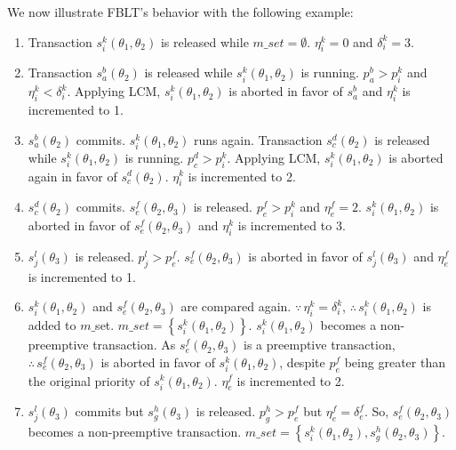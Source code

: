 \documentclass[prodmode,acmtecs]{acmsmall}
\begin{document}
We now illustrate FBLT's behavior with the following example:
\begin{enumerate}
\item Transaction $s_{i}^{k}(\theta_{1},\theta_{2})$ is released while
$m\_set=\emptyset$. $\eta_{i}^{k}=0$ and $\delta_{i}^{k}=3$.
\item \label{fblt_ex_step 2} Transaction $s_{a}^{b}(\theta_{2})$ is released
while $s_{i}^{k}(\theta_{1},\theta_{2})$ is running. $p_{a}^{b}>p_{i}^{k}$
and $\eta_{i}^{k}<\delta_{i}^{k}$. Applying LCM, $s_{i}^{k}(\theta_{1},\theta_{2})$
is aborted in favor of $s_{a}^{b}$ and $\eta_{i}^{k}$ is incremented
to 1.
\item $s_{a}^{b}(\theta_{2})$ commits. $s_{i}^{k}(\theta_{1},\theta_{2})$
runs again. Transaction $s_{c}^{d}(\theta_{2})$ is released while
$s_{i}^{k}(\theta_{1},\theta_{2})$ is running. $p_{c}^{d}>p_{i}^{k}$. Applying LCM, $s_{i}^{k}(\theta_{1},\theta_{2})$ is aborted again in favor of $s_{c}^{d}(\theta_{2})$.
$\eta_{i}^{k}$ is incremented to 2.
\item $s_{c}^{d}(\theta_{2})$ commits. $s_{e}^{f}(\theta_{2},\theta_{3})$
is released. $p_{e}^{f}>p_{i}^{k}$ and $\eta_{e}^{f}=2$. $s_{i}^{k}(\theta_{1},\theta_{2})$
is aborted in favor of $s_{e}^{f}(\theta_{2},\theta_{3})$ and $\eta_{i}^{k}$
is incremented to 3.
\item $s_{j}^{l}(\theta_{3})$ is released. $p_{j}^{l}>p_{e}^{f}$. $s_{e}^{f}(\theta_{2},\theta_{3})$ is aborted in favor of $s_{j}^{l}(\theta_{3})$
and $\eta_{e}^{f}$ is incremented to 1.
\item \label{fblt_ex_step 6} $s_{i}^{k}(\theta_{1},\theta_{2})$ and $s_{e}^{f}(\theta_{2},\theta_{3})$
are compared again. $\because\,\eta_{i}^{k}=\delta_{i}^{k}$, $\therefore\, s_{i}^{k}(\theta_{1},\theta_{2})$
is added to $m\_$set. $m\_set=\left\{ s_{i}^{k}(\theta_{1},\theta_{2})\right\} $.
$s_{i}^{k}(\theta_{1},\theta_{2})$ becomes a non-preemptive transaction.
As $s_{e}^{f}(\theta_{2},\theta_{3})$ is a preemptive transaction, $\therefore\, s_{e}^{f}(\theta_{2},\theta_{3})$ is aborted in
favor of $s_{i}^{k}(\theta_{1},\theta_{2})$, despite $p_{e}^{f}$ being greater than the original priority of $s_i^k(\theta_1,\theta_2)$. $\eta_{e}^{f}$ is incremented to 2.
%
\item \label{fblt_ex_step 7} $s_{j}^{l}(\theta_{3})$ commits but $s_{g}^{h}(\theta_{3})$
is released. $p_{g}^{h}>p_{e}^{f}$ but $\eta_{e}^{f}=\delta_{e}^{f}$.
So, $s_{e}^{f}(\theta_{2},\theta_{3})$ becomes a non-preemptive transaction.
$m\_set=\left\{ s_{i}^{k}(\theta_{1},\theta_{2}),s_{g}^{h}(\theta_{2},\theta_{3})\right\} $.

\end{enumerate}
\end{document}
